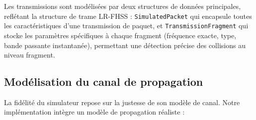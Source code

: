 Les transmissions sont modélisées par deux structures de données principales, reflétant la structure de trame LR-FHSS : \texttt{SimulatedPacket} qui encapsule toutes les caractéristiques d'une transmission de paquet, et \texttt{TransmissionFragment} qui stocke les paramètres spécifiques à chaque fragment (fréquence exacte, type, bande passante instantanée), permettant une détection précise des collisions au niveau fragment.

\subsection{Modélisation du canal de propagation}

La fidélité du simulateur repose sur la justesse de son modèle de canal. Notre implémentation intègre un modèle de propagation réaliste :

